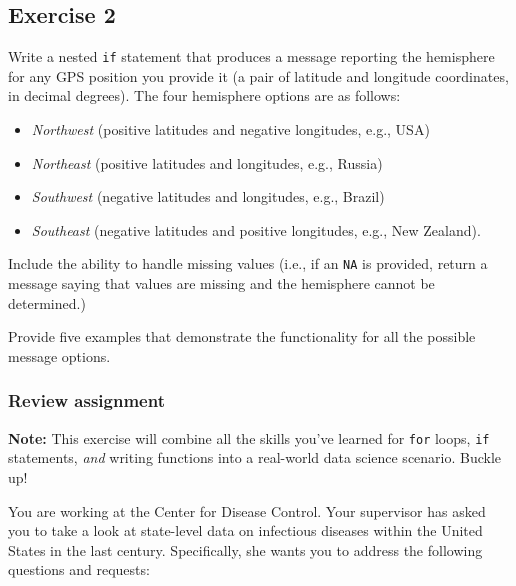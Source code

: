\documentclass[
]{book}
\providecommand{\tightlist}{%
  \setlength{\itemsep}{0pt}\setlength{\parskip}{0pt}}
\begin{document}
\hypertarget{exercise-2-7}{%
\subsection*{Exercise 2}\label{exercise-2-7}}

Write a nested \texttt{if} statement that produces a message reporting the hemisphere for any GPS position you provide it (a pair of latitude and longitude coordinates, in decimal degrees). The four hemisphere options are as follows:

\begin{itemize}
\tightlist
\item
  \emph{Northwest} (positive latitudes and negative longitudes, e.g., USA)\\
\item
  \emph{Northeast} (positive latitudes and longitudes, e.g., Russia)
\item
  \emph{Southwest} (negative latitudes and longitudes, e.g., Brazil)\\
\item
  \emph{Southeast} (negative latitudes and positive longitudes, e.g., New Zealand).
\end{itemize}

Include the ability to handle missing values (i.e., if an \texttt{NA} is provided, return a message saying that values are missing and the hemisphere cannot be determined.)

Provide five examples that demonstrate the functionality for all the possible message options.

\hypertarget{review-assignment-8}{%
\subsubsection*{Review assignment}\label{review-assignment-8}}

\textbf{Note:} This exercise will combine all the skills you've learned for \texttt{for} loops, \texttt{if} statements, \emph{and} writing functions into a real-world data science scenario. Buckle up!

You are working at the Center for Disease Control. Your supervisor has asked you to take a look at state-level data on infectious diseases within the United States in the last century. Specifically, she wants you to address the following questions and requests:
\end{document}
